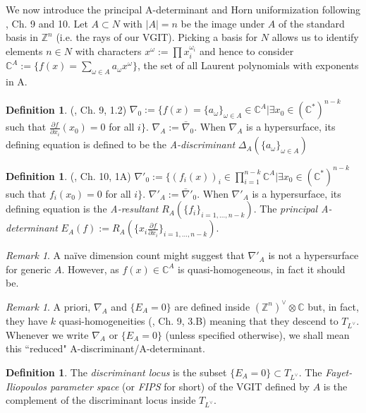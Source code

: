 \documentclass[a4paper]{article}
\theoremstyle{plain}
\theoremstyle{definition}
\newtheorem{df}[thm]{Definition}
\theoremstyle{remark}
\newtheorem{rem}[thm]{Remark}
\begin{document}
We now introduce the principal A-determinant and Horn uniformization following \cite{GKZ}, Ch. 9 and 10. Let $A \subset N$ with $|A|=n$ be the image under $A$ of the standard basis in $\mathbb{Z}^n$ (i.e. the rays of our VGIT). Picking a basis for $N$ allows us to identify elements $n \in N$ with characters $x^{\omega}:=\prod x_i^{\omega_i}$ and hence to consider $\mathbb{C}^{A}:=\{f(x)=\sum_{\omega \in A} a_{\omega} x^{\omega} \}$, the set of all Laurent polynomials with exponents in A. 
\begin{df}{(\cite{GKZ}, Ch. 9, 1.2)}
$\nabla_0:=\{ f(x)=\{a_{\omega}\}_{\omega \in A} \in \mathbb{C}^A | \exists x_0 \in (\mathbb{C}^*)^{n-k}$ such that $\frac{\partial f}{\partial x_i}(x_0)=0$ for all $i \}$. $\nabla_A:=\bar{\nabla}_0$. When $\nabla_A$ is a hypersurface, its defining equation is defined to be the \textit{A-discriminant} $\Delta_A(\{a_{\omega}\}_{\omega \in A})$
\end{df}

\begin{df}{(\cite{GKZ}, Ch. 10, 1A)}
$\nabla'_0:=\{ (f_i(x))_i \in \prod_{i=1}^{n-k} \mathbb{C}^A | \exists x_0 \in (\mathbb{C}^*)^{n-k}$ such that $f_i(x_0)=0$ for all $i \}$. $\nabla'_A:=\bar{\nabla}'_0$. When $\nabla'_A$ is a hypersurface, its defining equation is the \textit{A-resultant} $R_A(\{f_i\}_{i=1, \hdots, n-k})$. The \textit{principal A-determinant} $E_A(f):=R_A(\{x_i \frac{\partial f}{\partial x_i}\}_{i=1, \hdots, n-k})$.
\end{df}

\begin{rem}
A na\"ive dimension count might suggest that $\nabla'_A$ is not a hypersurface for generic $A$. However, as $f(x) \in \mathbb{C}^A$ is quasi-homogeneous, in fact it should be.
\end{rem}

\begin{rem} 
A priori, $\nabla_A$ and $\{E_A=0\}$ are defined inside $(\mathbb{Z}^n)^{\vee} \otimes \mathbb{C}$ but, in fact, they have $k$ quasi-homogeneities (\cite{GKZ}, Ch. 9, 3.B) meaning that they descend to $T_{L^{\vee}}$. Whenever we write $\nabla_A$ or $\{E_A=0\}$ (unless specified otherwise), we shall mean this ``reduced" A-discriminant/A-determinant. 
\end{rem}

\begin{df}
The \textit{discriminant locus} is the subset $\{E_A=0\} \subset T_{L^{\vee}}$. The \textit{Fayet-Iliopoulos parameter space} (or \textit{FIPS} for short) of the VGIT defined by $A$ is the complement of the discriminant locus inside $T_{L^{\vee}}$.
\label{FIPS} 
\end{df}
\end{document}
